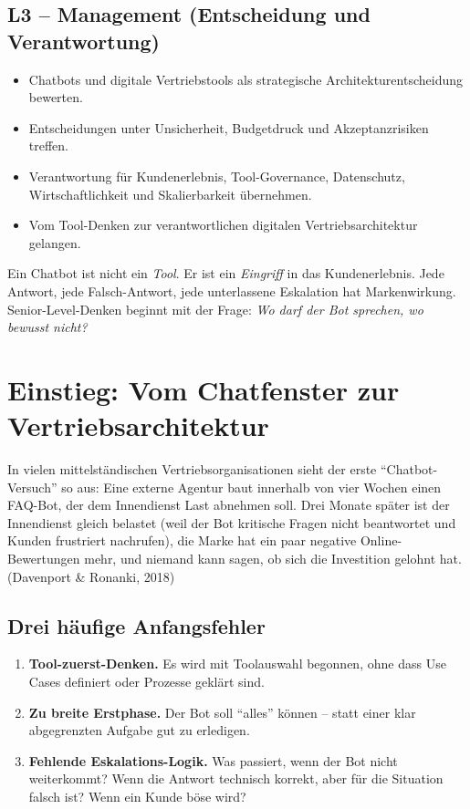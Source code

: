 \documentclass[11pt,a4paper,oneside]{article}
\newcommand{\fachbegriff}[1]{\textbf{#1}}
\newcommand{\quelle}[1]{{\footnotesize\color{lpGray}(#1)}}
\begin{document}
\subsection*{L3 -- Management (Entscheidung und Verantwortung)}
\begin{itemize}
  \item Chatbots und digitale Vertriebstools als strategische Architekturentscheidung bewerten.
  \item Entscheidungen unter Unsicherheit, Budgetdruck und Akzeptanzrisiken treffen.
  \item Verantwortung für Kundenerlebnis, Tool-Governance, Datenschutz, Wirtschaftlichkeit und Skalierbarkeit übernehmen.
  \item Vom Tool-Denken zur verantwortlichen digitalen Vertriebsarchitektur gelangen.
\end{itemize}

\begin{merkbox}
Ein Chatbot ist nicht ein \emph{Tool}. Er ist ein \emph{Eingriff} in das Kundenerlebnis. Jede Antwort, jede Falsch-Antwort, jede unterlassene Eskalation hat Markenwirkung. Senior-Level-Denken beginnt mit der Frage: \emph{Wo darf der Bot sprechen, wo bewusst nicht?}
\end{merkbox}

\clearpage

\section{Einstieg: Vom Chatfenster zur Vertriebsarchitektur}

In vielen mittelständischen Vertriebsorganisationen sieht der erste ``Chatbot-Versuch'' so aus: Eine externe Agentur baut innerhalb von vier Wochen einen FAQ-Bot, der dem Innendienst Last abnehmen soll. Drei Monate später ist der Innendienst gleich belastet (weil der Bot kritische Fragen nicht beantwortet und Kunden frustriert nachrufen), die Marke hat ein paar negative Online-Bewertungen mehr, und niemand kann sagen, ob sich die Investition gelohnt hat. \quelle{Davenport \& Ronanki, 2018}

\subsection{Drei häufige Anfangsfehler}

\begin{enumerate}
  \item \fachbegriff{Tool-zuerst-Denken.} Es wird mit Toolauswahl begonnen, ohne dass Use Cases definiert oder Prozesse geklärt sind.
  \item \fachbegriff{Zu breite Erstphase.} Der Bot soll ``alles'' können -- statt einer klar abgegrenzten Aufgabe gut zu erledigen.
  \item \fachbegriff{Fehlende Eskalations-Logik.} Was passiert, wenn der Bot nicht weiterkommt? Wenn die Antwort technisch korrekt, aber für die Situation falsch ist? Wenn ein Kunde böse wird?
\end{enumerate}
\end{document}
